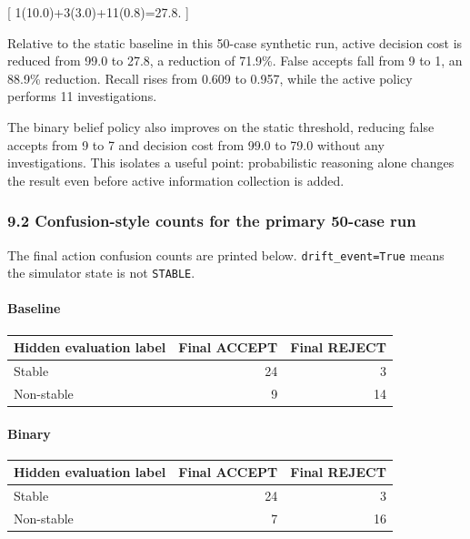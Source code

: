 \documentclass[
]{article}
\begin{document}
{[} 1(10.0)+3(3.0)+11(0.8)=27.8. {]}

Relative to the static baseline in this 50-case synthetic run, active
decision cost is reduced from 99.0 to 27.8, a reduction of 71.9\%. False
accepts fall from 9 to 1, an 88.9\% reduction. Recall rises from 0.609
to 0.957, while the active policy performs 11 investigations.

The binary belief policy also improves on the static threshold, reducing
false accepts from 9 to 7 and decision cost from 99.0 to 79.0 without
any investigations. This isolates a useful point: probabilistic
reasoning alone changes the result even before active information
collection is added.

\subsubsection{9.2 Confusion-style counts for the primary 50-case
run}\label{confusion-style-counts-for-the-primary-50-case-run}

The final action confusion counts are printed below.
\texttt{drift\_event=True} means the simulator state is not
\texttt{STABLE}.

\paragraph{Baseline}\label{baseline}

\begin{longtable}[]{@{}lrr@{}}
\toprule\noalign{}
Hidden evaluation label & Final ACCEPT & Final REJECT \\
\midrule\noalign{}
\endhead
\bottomrule\noalign{}
\endlastfoot
Stable & 24 & 3 \\
Non-stable & 9 & 14 \\
\end{longtable}

\paragraph{Binary}\label{binary}

\begin{longtable}[]{@{}lrr@{}}
\toprule\noalign{}
Hidden evaluation label & Final ACCEPT & Final REJECT \\
\midrule\noalign{}
\endhead
\bottomrule\noalign{}
\endlastfoot
Stable & 24 & 3 \\
Non-stable & 7 & 16 \\
\end{longtable}
\end{document}
